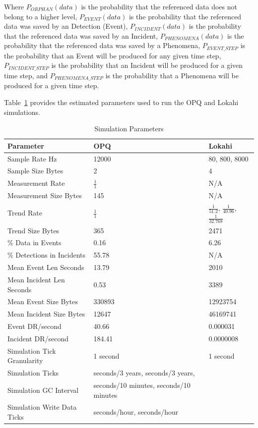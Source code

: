 Where $P_{ORPHAN}(data)$ is the probability that the referenced data does not belong to a higher level, $P_{EVENT}(data)$ is the probability that the referenced data was saved by an Detection (Event), $P_{INCIDENT}(data)$ is the probability that the referenced data was saved by an Incident, $P_{PHENOMENA}(data)$ is the probability that the referenced data was saved by a Phenomena, $P_{EVENT\_STEP}$ is the probability that an Event will be produced for any given time step, $P_{INCIDENT\_STEP}$ is the probability that an Incident will be produced for a given time step, and $P_{PHENOMENA\_STEP}$ is the probability that a Phenomena will be produced for a given time step.

Table~\ref{table:sim_params} provides the estimated parameters used to run the OPQ and Lokahi simulations.

\begin{table}[H]
	\centering
	\caption{Simulation Parameters}
	\begin{tabularx}{\textwidth}{Xll}
		\toprule
		\textbf{Parameter} & \textbf{OPQ} & \textbf{Lokahi} \\
		\midrule
		Sample Rate Hz & 12000 & 80, 800, 8000 \\
		Sample Size Bytes & 2 & 4 \\
		Measurement Rate & $\frac{1}{1}$ & N/A \\
		Measurement Size Bytes & 145 & N/A \\
		Trend Rate & $\frac{1}{1}$ & $\frac{1}{51.2}$, $\frac{1}{40.96}$, $\frac{1}{32.768}$ \\
		Trend Size Bytes & 365 & 2471 \\
		\% Data in Events & 0.16 & 6.26 \\
		\% Detections in Incidents & 55.78 & N/A \\
		Mean Event Len Seconds & 13.79 & 2010 \\
		Mean Incident Len Seconds & 0.53 & 3389 \\
		Mean Event Size Bytes & 330893 & 12923754 \\
		Mean Incident Size Bytes & 12647 & 46169741 \\
		Event DR/second & 40.66 &  0.000031 \\
		Incident DR/second & 184.41 &  0.0000008 \\
		Simulation Tick Granularity & 1 second & 1 second \\
		Simulation Ticks & seconds/3 years, seconds/3 years, \\
		Simulation GC Interval & seconds/10 minutes, seconds/10 minutes \\
		Simulation Write Data Ticks & seconds/hour, seconds/hour \\
		\bottomrule
	\end{tabularx}
	\label{table:sim_params}
\end{table}

